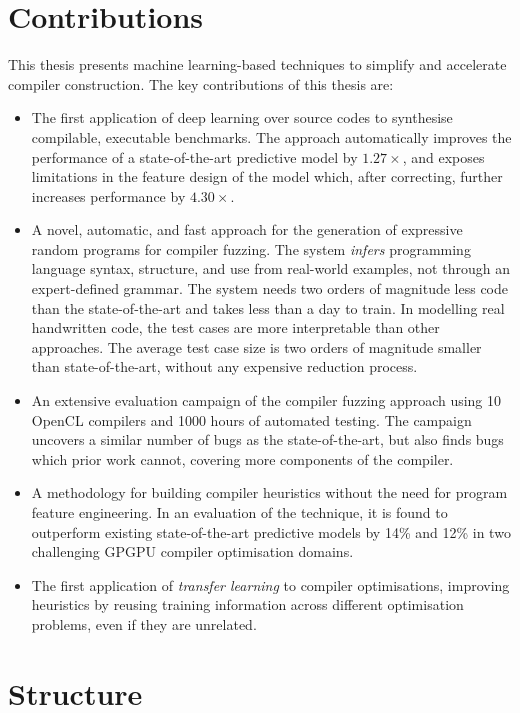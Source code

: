 \section{Contributions}

This thesis presents machine learning-based techniques to simplify and accelerate compiler construction. The key contributions of this thesis are:

\begin{itemize}
  \item The first application of deep learning over source codes to synthesise compilable, executable benchmarks. The approach automatically improves the performance of a state-of-the-art predictive model by $1.27\times$, and exposes limitations in the feature design of the model which, after correcting, further increases performance by $4.30\times$.
  \item A novel, automatic, and fast approach for the generation of expressive random programs for compiler fuzzing. The system \emph{infers} programming language syntax, structure, and use from real-world examples, not through an expert-defined grammar. The system needs two orders of magnitude less code than the state-of-the-art and takes less than a day to train. In modelling real handwritten code, the test cases are more interpretable than other approaches. The average test case size is two orders of magnitude smaller than state-of-the-art, without any expensive reduction process.
  \item An extensive evaluation campaign of the compiler fuzzing approach using 10 OpenCL compilers and 1000 hours of automated testing. The campaign uncovers a similar number of bugs as the state-of-the-art, but also finds bugs which prior work cannot, covering more components of the compiler.
	\item A methodology for building compiler heuristics without the need for program feature engineering. In an evaluation of the technique, it is found to outperform existing state-of-the-art predictive models by 14\% and 12\% in two challenging GPGPU compiler optimisation domains.
	\item The first application of \emph{transfer learning} to compiler optimisations, improving heuristics by reusing training information across different optimisation problems, even if they are unrelated.
\end{itemize}

\newpage
\section{Structure}

